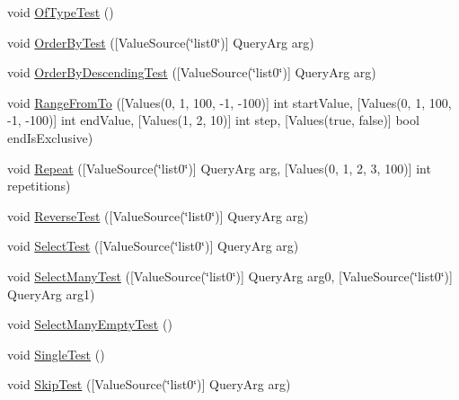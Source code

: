 \begin{DoxyCompactItemize}
\item 
void \mbox{\hyperlink{class_leap_1_1_unity_1_1_tests_1_1_query_tests_ac5467e4132f5be56dc162ffdcba0d085}{Of\+Type\+Test}} ()
\item 
void \mbox{\hyperlink{class_leap_1_1_unity_1_1_tests_1_1_query_tests_a7ea493534f3b6a7dc1d376d5c6cd4d70}{Order\+By\+Test}} (\mbox{[}Value\+Source(\char`\"{}list0\char`\"{})\mbox{]} Query\+Arg arg)
\item 
void \mbox{\hyperlink{class_leap_1_1_unity_1_1_tests_1_1_query_tests_a2bbb69deffc98452e8b387438485c01f}{Order\+By\+Descending\+Test}} (\mbox{[}Value\+Source(\char`\"{}list0\char`\"{})\mbox{]} Query\+Arg arg)
\item 
void \mbox{\hyperlink{class_leap_1_1_unity_1_1_tests_1_1_query_tests_ae009f348590b2db73ccbeb78f7b642cb}{Range\+From\+To}} (\mbox{[}Values(0, 1, 100, -\/1, -\/100)\mbox{]} int start\+Value, \mbox{[}Values(0, 1, 100, -\/1, -\/100)\mbox{]} int end\+Value, \mbox{[}Values(1, 2, 10)\mbox{]} int step, \mbox{[}Values(true, false)\mbox{]} bool end\+Is\+Exclusive)
\item 
void \mbox{\hyperlink{class_leap_1_1_unity_1_1_tests_1_1_query_tests_ad81f80eef768928fe3ce68cad67ec93f}{Repeat}} (\mbox{[}Value\+Source(\char`\"{}list0\char`\"{})\mbox{]} Query\+Arg arg, \mbox{[}Values(0, 1, 2, 3, 100)\mbox{]} int repetitions)
\item 
void \mbox{\hyperlink{class_leap_1_1_unity_1_1_tests_1_1_query_tests_a86da088c148763716146ec948dcbbd9d}{Reverse\+Test}} (\mbox{[}Value\+Source(\char`\"{}list0\char`\"{})\mbox{]} Query\+Arg arg)
\item 
void \mbox{\hyperlink{class_leap_1_1_unity_1_1_tests_1_1_query_tests_ad3e9e03a9711e7d6d1e1400b1f69c3b9}{Select\+Test}} (\mbox{[}Value\+Source(\char`\"{}list0\char`\"{})\mbox{]} Query\+Arg arg)
\item 
void \mbox{\hyperlink{class_leap_1_1_unity_1_1_tests_1_1_query_tests_ad189d8d7213ac96c7f8bf5eb26b608e0}{Select\+Many\+Test}} (\mbox{[}Value\+Source(\char`\"{}list0\char`\"{})\mbox{]} Query\+Arg arg0, \mbox{[}Value\+Source(\char`\"{}list0\char`\"{})\mbox{]} Query\+Arg arg1)
\item 
void \mbox{\hyperlink{class_leap_1_1_unity_1_1_tests_1_1_query_tests_a4c0a09f667832d9f452ce5a4e484eee0}{Select\+Many\+Empty\+Test}} ()
\item 
void \mbox{\hyperlink{class_leap_1_1_unity_1_1_tests_1_1_query_tests_a3b596b7da3d74c138b4dcffcab921840}{Single\+Test}} ()
\item 
void \mbox{\hyperlink{class_leap_1_1_unity_1_1_tests_1_1_query_tests_a8c78407cd4d023a664b06cdbc90fb36d}{Skip\+Test}} (\mbox{[}Value\+Source(\char`\"{}list0\char`\"{})\mbox{]} Query\+Arg arg)

\end{DoxyCompactItemize}
